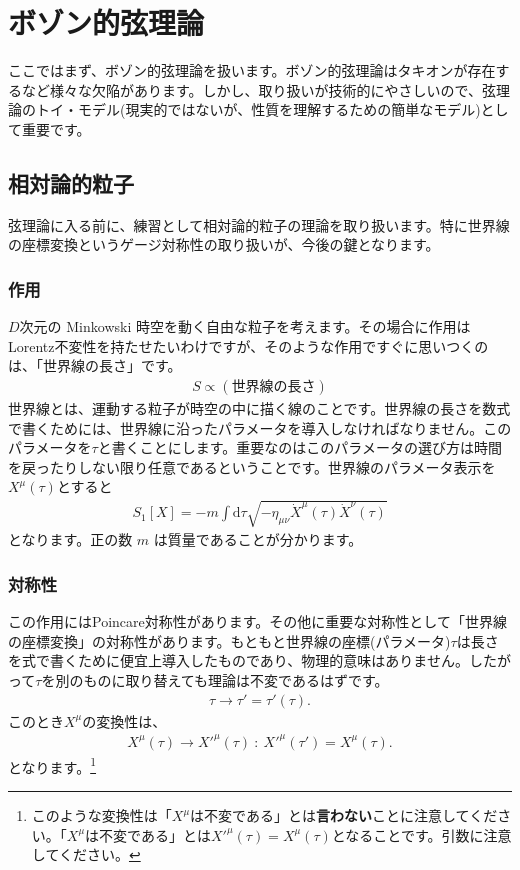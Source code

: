 \documentclass[report,paper=a4, fontsize=12pt, line_length=16cm, number_of_lines=34,dvipdfmx]{jlreq}
\numberwithin{equation}{chapter}
\numberwithin{equation}{section}
\newcommand{\kyou}[1]{{\sffamily \bfseries #1}}
\newcommand{\di}{\mathrm{d}}
\begin{document}
\chapter{ボゾン的弦理論}

ここではまず、ボゾン的弦理論を扱います。ボゾン的弦理論はタキオンが存在するなど様々な欠陥があります。しかし、取り扱いが技術的にやさしいので、弦理論のトイ・モデル(現実的ではないが、性質を理解するための簡単なモデル)として重要です。

\section{相対論的粒子}
弦理論に入る前に、練習として相対論的粒子の理論を取り扱います。特に世界線の座標変換というゲージ対称性の取り扱いが、今後の鍵となります。
\subsection{作用}
$D$次元の Minkowski 時空を動く自由な粒子を考えます。その場合に作用はLorentz不変性を持たせたいわけですが、そのような作用ですぐに思いつくのは、「世界線の長さ」です。
\begin{align}
 S \propto (\text{世界線の長さ})
\end{align}
世界線とは、運動する粒子が時空の中に描く線のことです。世界線の長さを数式で書くためには、世界線に沿ったパラメータを導入しなければなりません。このパラメータを$\tau$と書くことにします。重要なのはこのパラメータの選び方は時間を戻ったりしない限り任意であるということです。世界線のパラメータ表示を$X^{\mu}(\tau)$とすると
\begin{align}
 S_{1}[X]=-m\int \di \tau \sqrt{-\eta_{\mu\nu}\dot{X}^{\mu}(\tau) \dot{X}^{\nu}(\tau)}
\label{particle-action1}
\end{align}
となります。正の数 $m$ は質量であることが分かります。
\subsection{対称性}
この作用にはPoincare対称性があります。その他に重要な対称性として「世界線の座標変換」の対称性があります。もともと世界線の座標(パラメータ)$\tau$は長さを式で書くために便宜上導入したものであり、物理的意味はありません。したがって$\tau$を別のものに取り替えても理論は不変であるはずです。
\begin{align}
 \tau\to \tau'=\tau'(\tau).
\end{align}
このとき$X^{\mu}$の変換性は、
\begin{align}
 X^{\mu}(\tau)\to X'^{\mu}(\tau)\ :\ X'^{\mu}(\tau')=X^{\mu}(\tau).
\label{particle-reparam1}
\end{align}
となります。\footnote{このような変換性は「$X^{\mu}$は不変である」とは\kyou{言わない}ことに注意してください。「$X^{\mu}$は不変である」とは$X'^{\mu}(\tau)=X^{\mu}(\tau)$となることです。引数に注意してください。}
\end{document}
